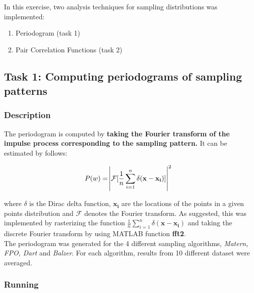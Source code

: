 \documentclass[paper=a4, fontsize=11pt]{scrartcl} %
\numberwithin{equation}{section} %
\numberwithin{figure}{section} %
\numberwithin{table}{section} %
\newcommand{\funcname}[1]{\textbf{#1}}
\renewcommand{\vec}[1]{\mathbf{#1}}
\begin{document}
In this exercise, two analysis techniques for sampling distributions was implemented:

\begin{enumerate}
	\item Periodogram (task 1)
	\item Pair Correlation Functions (task 2)
\end{enumerate}

\subsection{Task 1: Computing periodograms of sampling patterns}

\subsubsection{Description}

The periodogram is computed by \textbf{taking the Fourier transform of the impulse process corresponding to the sampling pattern.} It can be estimated by follows:

\begin{equation}
	P(w) = \abs{ \mathcal{F} [\frac{1}{n} \sum_{i=1}^{n} \delta(\vec{x} - \vec{x_i})]}^2
\end{equation}

where $\delta$ is the Dirac delta function, $\vec{x_i}$ are the locations of the points in a given points distribution and $\mathcal{F}$ denotes the Fourier transform. As suggested, this was implemented by rasterizing the function $\frac{1}{n} \sum_{i=1}^{n} \delta(\vec{x} - \vec{x_i})$ and taking the discrete Fourier transform by using MATLAB function \funcname{fft2}. 
\\

The periodogram was generated for the 4 different sampling algorithms, \textit{Matern, FPO, Dart} and \textit{Balzer}. For each algorithm, results from 10 different dataset were averaged.  

\subsubsection{Running}
\end{document}

